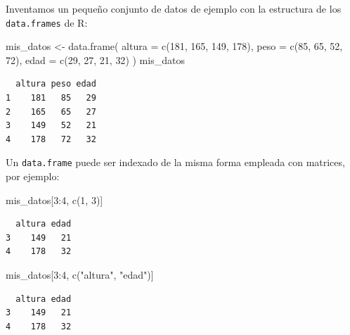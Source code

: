 \documentclass[
]{book}
\newenvironment{Shaded}{\begin{snugshade}}{\end{snugshade}}
\newcommand{\AttributeTok}[1]{\textcolor[rgb]{0.77,0.63,0.00}{#1}}
\newcommand{\DecValTok}[1]{\textcolor[rgb]{0.00,0.00,0.81}{#1}}
\newcommand{\FunctionTok}[1]{\textcolor[rgb]{0.00,0.00,0.00}{#1}}
\newcommand{\NormalTok}[1]{#1}
\newcommand{\OtherTok}[1]{\textcolor[rgb]{0.56,0.35,0.01}{#1}}
\newcommand{\SpecialCharTok}[1]{\textcolor[rgb]{0.00,0.00,0.00}{#1}}
\newcommand{\StringTok}[1]{\textcolor[rgb]{0.31,0.60,0.02}{#1}}
\begin{document}
Inventamos un pequeño conjunto de datos de ejemplo con la estructura de los \texttt{data.frames} de R:

\begin{Shaded}
\begin{Highlighting}[]
\NormalTok{mis\_datos }\OtherTok{\textless{}{-}} \FunctionTok{data.frame}\NormalTok{(}
    \AttributeTok{altura =} \FunctionTok{c}\NormalTok{(}\DecValTok{181}\NormalTok{, }\DecValTok{165}\NormalTok{, }\DecValTok{149}\NormalTok{, }\DecValTok{178}\NormalTok{),}
    \AttributeTok{peso =} \FunctionTok{c}\NormalTok{(}\DecValTok{85}\NormalTok{, }\DecValTok{65}\NormalTok{, }\DecValTok{52}\NormalTok{, }\DecValTok{72}\NormalTok{),}
    \AttributeTok{edad =} \FunctionTok{c}\NormalTok{(}\DecValTok{29}\NormalTok{, }\DecValTok{27}\NormalTok{, }\DecValTok{21}\NormalTok{, }\DecValTok{32}\NormalTok{)}
\NormalTok{)}
\NormalTok{mis\_datos}
\end{Highlighting}
\end{Shaded}

\begin{verbatim}
  altura peso edad
1    181   85   29
2    165   65   27
3    149   52   21
4    178   72   32
\end{verbatim}

Un \texttt{data.frame} puede ser indexado de la misma forma empleada con matrices, por ejemplo:

\begin{Shaded}
\begin{Highlighting}[]
\NormalTok{mis\_datos[}\DecValTok{3}\SpecialCharTok{:}\DecValTok{4}\NormalTok{, }\FunctionTok{c}\NormalTok{(}\DecValTok{1}\NormalTok{, }\DecValTok{3}\NormalTok{)]}
\end{Highlighting}
\end{Shaded}

\begin{verbatim}
  altura edad
3    149   21
4    178   32
\end{verbatim}

\begin{Shaded}
\begin{Highlighting}[]
\NormalTok{mis\_datos[}\DecValTok{3}\SpecialCharTok{:}\DecValTok{4}\NormalTok{, }\FunctionTok{c}\NormalTok{(}\StringTok{"altura"}\NormalTok{, }\StringTok{"edad"}\NormalTok{)]}
\end{Highlighting}
\end{Shaded}

\begin{verbatim}
  altura edad
3    149   21
4    178   32
\end{verbatim}
\end{document}
